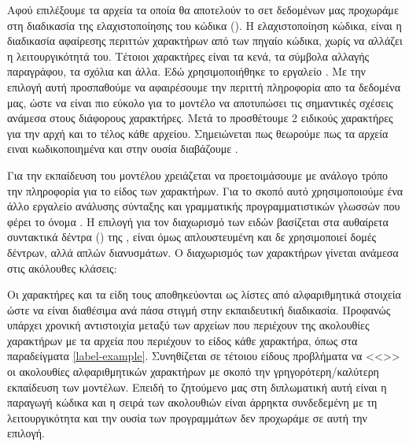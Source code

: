 Αφού επιλέξουμε τα αρχεία τα οποία θα αποτελούν το σετ δεδομένων μας προχωράμε στη διαδικασία της ελαχιστοποίησης του κώδικα ().
Η ελαχιστοποίηση κώδικα, είναι η διαδικασία αφαίρεσης περιττών χαρακτήρων από των πηγαίο κώδικα, χωρίς να αλλάζει η λειτουργικότητά του. Τέτοιοι χαρακτήρες είναι τα κενά, τα σύμβολα αλλαγής παραγράφου, τα σχόλια και άλλα. Εδώ χρησιμοποιήθηκε το εργαλείο .
Με την επιλογή αυτή προσπαθούμε να αφαιρέσουμε την περιττή πληροφορία απο τα δεδομένα μας, ώστε να είναι πιο εύκολο για το μοντέλο να αποτυπώσει τις σημαντικές σχέσεις ανάμεσα στους διάφορους χαρακτήρες.
Μετά το  προσθέτουμε 2 ειδικούς χαρακτήρες για την αρχή και το τέλος κάθε αρχείου. Σημειώνεται πως θεωρούμε πως τα αρχεία ειναι  κωδικοποιημένα και στην ουσία διαβάζουμε . 

Για την εκπαίδευση του μοντέλου  χρειάζεται να προετοιμάσουμε με ανάλογο τρόπο την πληροφορία για το είδος των χαρακτήρων. Για το σκοπό αυτό χρησιμοποιούμε ένα άλλο εργαλείο ανάλυσης σύνταξης και γραμματικής προγραμματιστικών γλωσσών που φέρει το όνομα .
Η επιλογή για τον διαχωρισμό των ειδών βασίζεται στα αυθαίρετα συντακτικά δέντρα () της , είναι όμως απλουστευμένη και δε χρησιμοποιεί δομές δέντρων, αλλά απλών διανυσμάτων.
Ο διαχωρισμός των χαρακτήρων γίνεται ανάμεσα στις ακόλουθες κλάσεις: 

Οι χαρακτήρες και τα είδη τους αποθηκεύονται ως λίστες από αλφαριθμητικά στοιχεία ώστε να είναι διαθέσιμα ανά πάσα στιγμή στην εκπαιδευτική διαδικασία.
Προφανώς υπάρχει χρονική αντιστοιχία μεταξύ των αρχείων που περιέχουν της ακολουθίες χαρακτήρων με τα αρχεία που περιέχουν το είδος κάθε χαρακτήρα, όπως στα παραδείγματα \ref{label-example}.
Συνηθίζεται σε τέτοιου είδους προβλήματα να <<>> οι ακολουθίες αλφαριθμητικών χαρακτήρων με σκοπό την γρηγορότερη/καλύτερη εκπαίδευση των μοντέλων.
Επειδή το ζητούμενο μας στη διπλωματική αυτή είναι η παραγωγή κώδικα και η σειρά των ακολουθιών είναι άρρηκτα συνδεδεμένη με τη λειτουργικότητα και την ουσία των προγραμμάτων δεν προχωράμε σε αυτή την επιλογή.  

